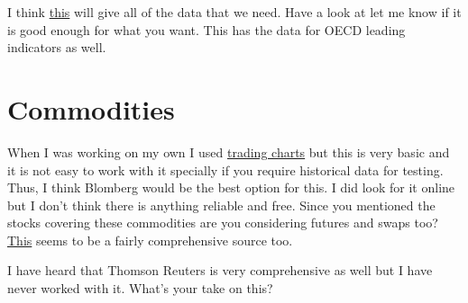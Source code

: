 \documentclass[12 pt]{article}
\begin{document}
I think \href{http://stats.oecd.org/index.aspx}{this} will give all of the data that we need. Have a look at let me know if it is good enough for what you want. This has the data for OECD leading indicators as well. 

\section{Commodities}
When I was working on my own I used \href{http://futures.tradingcharts.com/menu.html}{trading charts} but this is very basic and it is not easy to work with it specially if you require historical data for testing. Thus, I think Blomberg would be the best option for this. I did look for it online but I don't think there is anything reliable and free. Since you mentioned the stocks covering these commodities are you considering futures and swaps too?\\ \href{https://globalderivatives.nyx.com/nl/commodities/nyse-liffe/contract-list}{This} seems to be a fairly comprehensive source too. 

I have heard that Thomson Reuters is very comprehensive as well but I have never worked with it. What's your take on this?
\end{document}
